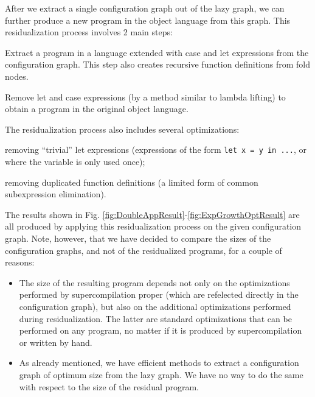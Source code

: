 \documentclass[submission,copyright,creativecommons]{eptcs}
\begin{document}
After we extract a single configuration graph out of the lazy graph, we can further
produce a new program in the object language from this graph.
This residualization process involves 2 main steps:
  \begin{enumerate*}[label=\itshape\arabic*\upshape)]
    \item Extract a program in a language extended with case and let expressions from the configuration graph.
      This step also creates recursive function definitions from fold nodes.
    \item Remove let and case expressions (by a method similar to lambda lifting) to
      obtain a program in the original object language.
  \end{enumerate*}
The residualization process also includes several optimizations:
  \begin{enumerate*}[label=\itshape\alph*\upshape)]
    \item removing ``trivial'' let expressions (expressions of the form \verb|let x = y in ...|, or where the variable is
      only used once);
    \item removing duplicated function definitions (a limited form of common subexpression elimination).
  \end{enumerate*}
The results shown in Fig. \ref{fig:DoubleAppResult}-\ref{fig:ExpGrowthOptResult} are all produced by applying
this residualization process on the given configuration graph.
Note, however, that we have decided to compare the sizes of the configuration graphs, and not of the residualized
programs, for a couple of reasons:
\begin{itemize}
  \item The size of the resulting program depends not only on the optimizations performed by supercompilation proper
    (which are refelected directly in the configuration graph), but also on the additional optimizations performed
    during residualization.
    The latter are standard optimizations that can be performed on any program, no matter if it is produced
    by supercompilation or written by hand.
  \item As already mentioned, we have efficient methods to extract a configuration graph of optimum size from the lazy graph.
    We have no way to do the same with respect to the size of the residual program.
\end{itemize}
\end{document}
